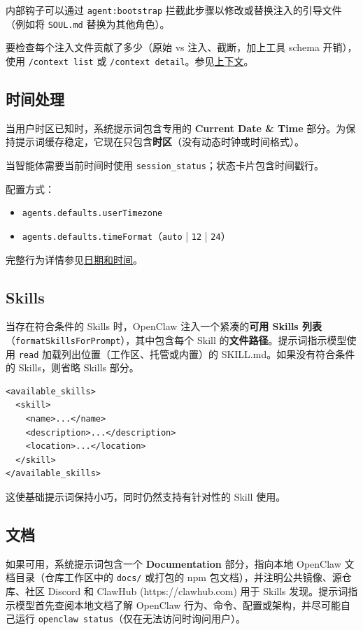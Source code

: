 内部钩子可以通过 \texttt{agent:bootstrap} 拦截此步骤以修改或替换注入的引导文件（例如将 \texttt{SOUL.md} 替换为其他角色）。

要检查每个注入文件贡献了多少（原始 vs 注入、截断，加上工具 schema 开销），使用 \texttt{/context list} 或 \texttt{/context detail}。参见\href{/concepts/context}{上下文}。

\subsection{时间处理}


当用户时区已知时，系统提示词包含专用的 \textbf{Current Date \& Time} 部分。为保持提示词缓存稳定，它现在只包含\textbf{时区}（没有动态时钟或时间格式）。

当智能体需要当前时间时使用 \texttt{session\_status}；状态卡片包含时间戳行。

配置方式：

\begin{itemize}
  \item \texttt{agents.defaults.userTimezone}
  \item \texttt{agents.defaults.timeFormat}（\texttt{auto} | \texttt{12} | \texttt{24}）
\end{itemize}


完整行为详情参见\href{/date-time}{日期和时间}。

\subsection{Skills}


当存在符合条件的 Skills 时，OpenClaw 注入一个紧凑的\textbf{可用 Skills 列表}（\texttt{formatSkillsForPrompt}），其中包含每个 Skill 的\textbf{文件路径}。提示词指示模型使用 \texttt{read} 加载列出位置（工作区、托管或内置）的 SKILL.md。如果没有符合条件的 Skills，则省略 Skills 部分。

\begin{lstlisting}
<available_skills>
  <skill>
    <name>...</name>
    <description>...</description>
    <location>...</location>
  </skill>
</available_skills>
\end{lstlisting}


这使基础提示词保持小巧，同时仍然支持有针对性的 Skill 使用。

\subsection{文档}


如果可用，系统提示词包含一个 \textbf{Documentation} 部分，指向本地 OpenClaw 文档目录（仓库工作区中的 \texttt{docs/} 或打包的 npm 包文档），并注明公共镜像、源仓库、社区 Discord 和 ClawHub (https://clawhub.com) 用于 Skills 发现。提示词指示模型首先查阅本地文档了解 OpenClaw 行为、命令、配置或架构，并尽可能自己运行 \texttt{openclaw status}（仅在无法访问时询问用户）。


